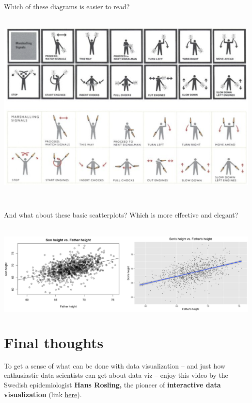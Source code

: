 \documentclass[
]{book}
\begin{document}
~

Which of these diagrams is easier to read?

~\\

\includegraphics{img/vis19.png}

~

And what about these basic scatterplots? Which is more effective and elegant?

~\\

\includegraphics{img/vish.png}

\hypertarget{final-thoughts}{%
\section*{Final thoughts}\label{final-thoughts}}

To get a sense of what can be done with data visualization -- and just how enthusiastic data scientists can get about data viz -- enjoy this video by the Swedish epidemiologist \textbf{Hans Rosling,} the pioneer of \textbf{interactive data visualization} (link \href{https://www.youtube.com/watch?v=jbkSRLYSojo\&t=2s}{here}).

~

~
\end{document}
